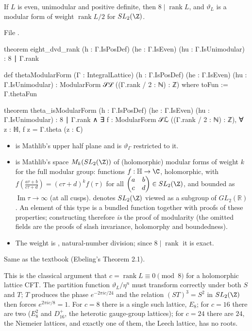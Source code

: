 \begin{theorem}\label{ch02:thm:eightdvd}
If $L$ is even, unimodular and positive definite, then $8\mid\operatorname{rank}L$, and
$\vartheta_L$ is a modular form of weight $\operatorname{rank}L/2$ for $SL_2(\Z)$.
\end{theorem}
\noindent File .
\begin{leancode}
theorem eight_dvd_rank (h : Γ.IsPosDef) (he : Γ.IsEven) (hu : Γ.IsUnimodular) : 8 ∣ Γ.rank

def thetaModularForm (Γ : IntegralLattice) (h : Γ.IsPosDef) (he : Γ.IsEven)
    (hu : Γ.IsUnimodular) : ModularForm 𝒮ℒ ((Γ.rank / 2 : ℕ) : ℤ) where
  toFun := Γ.thetaFun

theorem theta_isModularForm (h : Γ.IsPosDef) (he : Γ.IsEven) (hu : Γ.IsUnimodular) :
    8 ∣ Γ.rank ∧
      ∃ f : ModularForm 𝒮ℒ ((Γ.rank / 2 : ℕ) : ℤ), ∀ z : ℍ, f z = Γ.theta (z : ℂ)
\end{leancode}
\begin{dictionary}
\begin{itemize}
\item {} is Mathlib's upper half plane and  is $\vartheta_\Gamma$ restricted
  to it.
\item {} is Mathlib's space $M_k(SL_2(\Z))$ of (holomorphic) modular forms of
  weight $k$ for the full modular group: functions $f:\mathbb{H}\to\C$, holomorphic, with
  $f(\frac{a\tau+b}{c\tau+d})=(c\tau+d)^kf(\tau)$ for all $\begin{pmatrix}a&b\\c&d\end{pmatrix}\in
  SL_2(\Z)$, and bounded as $\operatorname{Im}\tau\to\infty$ (at all cusps).   denotes
  $SL_2(\Z)$ viewed as a subgroup of $GL_2(\mathbb{R})$.  An element of this type is a bundled
  function together with proofs of these properties; constructing 
  therefore \emph{is} the proof of modularity (the omitted fields are the proofs of slash
  invariance, holomorphy and boundedness).
\item The weight is , natural-number division; since $8\mid\operatorname{rank}$
  it is exact.
\end{itemize}
Same as the textbook (Ebeling's Theorem 2.1).
\end{dictionary}
\begin{physics}
This is the classical argument that $c=\operatorname{rank}L\equiv0\pmod8$ for a holomorphic lattice CFT. The partition function $\vartheta_L/\eta^n$ must transform correctly under both $S$ and $T$; $T$ produces the phase $e^{-2\pi ic/24}$ and the relation $(ST)^3=S^2$ in $SL_2(\Z)$ then forces $e^{2\pi ic/8}=1$. For $c=8$ there is a single such lattice, $E_8$; for $c=16$ there are two ($E_8^2$ and $D_{16}^+$, the heterotic gauge-group lattices); for $c=24$ there are $24$, the Niemeier lattices, and exactly one of them, the Leech lattice, has no roots.
\end{physics}
